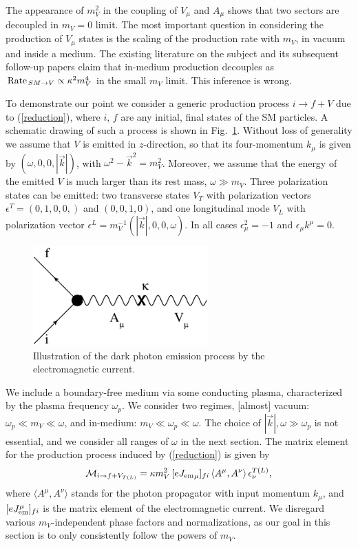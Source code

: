\documentclass[12pt]{article}
\begin{document}
The appearance of $m_V^2$ in the coupling of $V_\mu$ and $A_\mu$ shows
that two sectors are decoupled in $m_V=0$ limit. The most important
question in considering the production of $V_\mu$ states is the
scaling of the production rate with $m_V$, in vacuum and inside a medium.
The existing literature on the subject \cite{Redondo:2008aa} and its
subsequent follow-up papers claim that in-medium production decouples
as ${\rm Rate}_{ \,SM \to V} \propto \kappa^2 m_V^4$ in the small
$m_V$ limit.  This inference is wrong.

To demonstrate our point we consider a generic production process
$i\to f + V$ due to (\ref{reduction}), where $i,\,f$ are any initial,
final states of the SM particles. A schematic drawing of such a
process is shown in Fig.~\ref{fig:feynman}. Without loss of generality
we assume that $V$ is emitted in $z$-direction, so that its
four-momentum $k_\mu$ is given by $(\omega, 0, 0, |\vec{k}|)$, with
$\omega^2-\vec{k}^2=m_V^2$. Moreover, we assume that the energy of
the emitted $V$ is much larger than its rest mass, $\omega\gg m_V$. Three
polarization states can be emitted: two transverse states $V_T$ with
polarization vectors $\epsilon^T = (0,1,0,0,)$ and $(0,0,1,0)$,
and one longitudinal mode $V_L$ with polarization vector
$\epsilon^L = m_V^{-1}(|\vec{k}|,0,0,\omega)$.  In all cases
$\epsilon_\mu^2 =-1$ and $\epsilon_\mu k^\mu=0$.

\begin{figure}
\centering
\includegraphics[height=1.5in]{feynman-eps-converted-to.pdf}
\caption{Illustration of the dark photon emission process by the electromagnetic current.}\label{fig:feynman}
\end{figure}


We include a boundary-free medium via some conducting plasma, characterized by the plasma frequency 
$\omega_p$. We consider two regimes, [almost] vacuum: $ \omega_p \ll m_V \ll \omega$, and in-medium:
$ m_V \ll \omega_p \ll \omega$. The choice of $|\vec{k}|,\omega \gg \omega_p$ is not essential, and we consider 
all ranges of $\omega$ in the next section. 
The matrix element for the production process  
induced by (\ref{reduction}) is given by 
\begin{equation}
\label{amplitude}
{\cal M}_{i\to f+V_{T(L)}} = \kappa m_V^2\, [e {J_{\rm em}}_\mu]_{fi} \,\langle  A^\mu, A^\nu  \rangle\, \epsilon_\nu^{T(L)},
\end{equation} 
where $\langle  A^\mu, A^\nu  \rangle$ stands for the photon propagator with input momentum $k_\mu$, and 
$[e J_{\rm em}^\mu]_{fi}$ is the 
matrix element of the electromagnetic current. We disregard various $m_V$-independent 
phase factors and normalizations, as our goal in this section 
is to only consistently follow the powers of $m_V$. 
\end{document}
